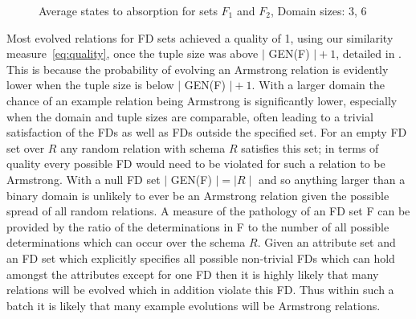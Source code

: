 \begin{figure}
\centerline{}
\caption{\label{graph:16_82}{Average states to absorption for sets $F_1$ and $F_2$, Domain sizes: 3, 6}}
\end{figure}
Most evolved relations for FD sets achieved a quality of 1, using
our similarity measure~\ref{eq:quality}, once the
tuple size was above $\mid$ GEN(F) $\mid + 1$, detailed in \cite{cl96}.
 This is because the probability
of evolving an Armstrong relation is evidently lower when the tuple size
 is below
$\mid$ GEN(F) $\mid + 1$. With a larger domain the chance of an example
relation being Armstrong is significantly lower, especially when the
domain and tuple sizes are comparable, often leading to a trivial
satisfaction of the FDs as well as FDs outside the specified set.
For an empty FD set over $R$ any random relation with schema $R$ satisfies this set;
in terms of quality every possible FD would need to be violated for such
a relation to be Armstrong.
 With a null FD set $\mid$ GEN(F) $\mid = \mid R \mid$ and so
anything larger than a binary domain is unlikely to ever be an Armstrong
relation given the possible spread of all random relations. A measure
of the pathology of an FD set F can be
 provided by the ratio
of the determinations in F to the number of all possible determinations
which can occur over the schema $R$.
Given an attribute set and an FD set
which explicitly specifies all possible non-trivial FDs which
can hold amongst the attributes except for one FD then it is highly likely that
many relations will be evolved which in addition violate this FD. Thus within
such a batch it is likely that many example evolutions will be Armstrong
relations. 

